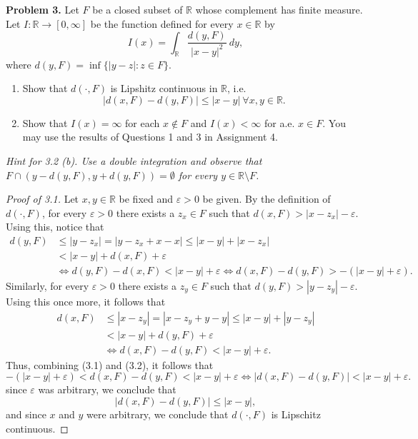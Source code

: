\noindent \textbf{Problem 3.} Let \( F \) be a closed subset of \( \mathbb{R} \) whose complement has finite measure. Let \( I : \mathbb{R} \to [0,\infty] \) be the function defined for every \( x \in \mathbb{R} \) by \[I(x) = \int_{\mathbb{R}} \frac{d(y,F)}{|x-y|^{2} } \ dy, \] where \( d(y,F) = \inf \{ |y - z| : z \in F \}  \).
\begin{enumerate}
	\item Show that \( d(\cdot, F) \) is Lipshitz continuous in \( \mathbb{R} \), i.e. \[|d(x,F) - d(y,F)| \leq |x-y| \ \forall x, y \in \mathbb{R}.\]
	\item Show that \( I(x) = \infty \) for each \( x \notin F \) and \( I(x) < \infty \) for a.e. \( x \in F \). You may use the results of Questions 1 and 3 in Assignment 4.
\end{enumerate}
\emph{Hint for 3.2 (b). Use a double integration and observe that \( F \cap (y - d(y, F), y + d(y, F)) = \emptyset  \) for every \( y \in \mathbb{R} \setminus F \).}
\begin{proof}[Proof of 3.1]
Let \( x, y \in \mathbb{R} \) be fixed and \( \varepsilon > 0 \) be given. By the definition of \( d(\cdot , F) \), for every \( \varepsilon > 0  \) there exists a \( z_{x} \in F \) such that \( d(x,F) > |x - z_{x} | - \varepsilon  \). Using this, notice that
\begin{align*}
	d(y,F) &\leq |y - z_{x}| = |y - z_{x} + x - x| \leq |x - y| + |x - z_{x}| \tag{triangle inequality} \\
	       &< |x - y| + d(x,F) + \varepsilon \tag{definition of infimum} \\
	       &\iff d(y,F) - d(x,F) < |x-y| + \varepsilon \iff d(x,F) - d(y,F) > -(|x-y| + \varepsilon ). \tag{3.1}
\end{align*}
Similarly, for every \( \varepsilon > 0 \) there exists a \( z_{y} \in F \) such that \( d(y,F) > |y - z_{y} | - \varepsilon  \). Using this once more, it follows that
\begin{align*}
	d(x,F) &\leq |x - z_{y} | = |x - z_{y} + y - y | \leq |x-y| + |y - z_{y}| \tag{triangle inequality} \\
	       &< |x-y| + d(y, F) + \varepsilon  \tag{definition of infimum} \\
	       & \iff d(x, F) - d(y, F) < |x- y | + \varepsilon . \tag{3.2}
\end{align*}
Thus, combining (3.1) and (3.2), it follows that \[  -(|x-y| + \varepsilon ) < d(x,F) - d(y,F) < |x-y| + \varepsilon \iff |d(x,F) - d(y,F)| < |x-y| + \varepsilon.  \] since \( \varepsilon  \) was arbitrary, we conclude that \[|d(x,F) - d(y,F)| \leq |x-y|,\] and since \( x \) and \( y \) were arbitrary, we conclude that \( d(\cdot , F) \) is Lipschitz continuous.
\end{proof}
